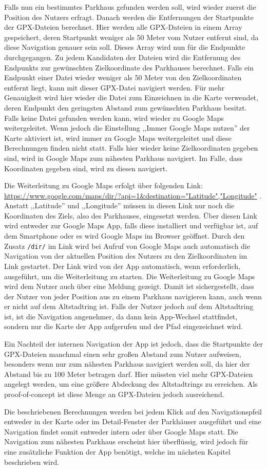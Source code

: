 Falls nun ein bestimmtes Parkhaus gefunden werden soll, wird wieder zuerst die Position des Nutzers erfragt. Danach werden die Entfernungen der Startpunkte der GPX-Dateien berechnet. Hier werden alle GPX-Dateien in einem Array gespeichert, deren Startpunkt weniger als 50 Meter vom Nutzer entfernt sind, da diese Navigation genauer sein soll. Dieses Array wird nun für die Endpunkte durchgegangen. Zu jedem Kandidaten der Dateien wird die Entfernung des Endpunkts zur gewünschten Zielkoordinate des Parkhauses berechnet. Falls ein Endpunkt einer Datei wieder weniger als 50 Meter von den Zielkoordinaten entfernt liegt, kann mit dieser GPX-Datei navigiert werden. Für mehr Genauigkeit wird hier wieder die Datei zum Einzeichnen in die Karte verwendet, deren Endpunkt den geringsten Abstand zum gewünschten Parkhaus besitzt. Falls keine Datei gefunden werden kann, wird wieder zu Google Maps weitergeleitet. Wenn jedoch die Einstellung ,,Immer Google Maps nutzen'' der Karte aktiviert ist, wird immer zu Google Maps weitergeleitet und diese Berechnungen finden nicht statt. Falls hier wieder keine Zielkoordinaten gegeben sind, wird in Google Maps zum nähesten Parkhaus navigiert. Im Falle, dass Koordinaten gegeben sind, wird zu diesen navigiert.

Die Weiterleitung zu Google Maps erfolgt über folgenden Link: \url{https://www.google.com/maps/dir/?api=1&destination="Latitude","Longitude"} \cite{MapsLinks}. Anstatt ,,Latitude'' und ,,Longitude'' müssen in diesen Link nur noch die Koordinaten des Ziels, also des Parkhauses, eingesetzt werden. Über diesen Link wird entweder zur Google Maps App, falls diese installiert und verfügbar ist, auf dem Smartphone oder es wird Google Maps im Browser geöffnet. Durch den Zusatz \verb|/dir/| im Link wird bei Aufruf von Google Maps auch automatisch die Navigation von der aktuellen Position des Nutzers zu den Zielkoordinaten im Link gestartet. Der Link wird von der App automatisch, wenn erforderlich, ausgeführt, um die Weiterleitung zu starten. Die Weiterleitung zu Google Maps wird dem Nutzer auch über eine Meldung gezeigt. Damit ist sichergestellt, dass der Nutzer von jeder Position aus zu einem Parkhaus navigieren kann, auch wenn er nicht auf dem Altstadtring ist. Falls der Nutzer jedoch auf dem Altstadtring ist, ist die Navigation angenehmer, da dann kein App-Wechsel stattfindet, sondern nur die Karte der App aufgerufen und der Pfad eingezeichnet wird.

Ein Nachteil der internen Navigation der App ist jedoch, dass die Startpunkte der GPX-Dateien manchmal einen sehr großen Abstand zum Nutzer aufweisen, besonders wenn nur zum nähesten Parkhaus navigiert werden soll, da hier der Abstand bis zu 100 Meter betragen darf. Hier müssten viel mehr GPX-Dateien angelegt werden, um eine größere Abdeckung des Altstadtrings zu erreichen. Als proof-of-concept ist diese Menge an GPX-Dateien jedoch ausreichend.

Die beschriebenen Berechnungen werden bei jedem Klick auf den Navigationspfeil entweder in der Karte oder im Detail-Fenster der Parkhäuser ausgeführt und eine Navigation findet somit entweder intern oder über Google Maps statt. Die Navigation zum nähesten Parkhaus erscheint hier überflüssig, wird jedoch für eine zusätzliche Funktion der App benötigt, welche im nächsten Kapitel beschrieben wird.
